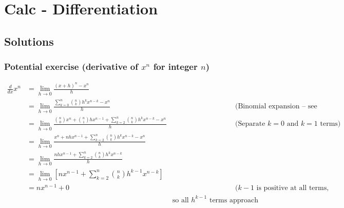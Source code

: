 \documentclass{book}
\begin{document}
\chapter{Calc - Differentiation}





\section{Solutions}

\subsection{Potential exercise (derivative of $x^n$ for integer $n$)}

\begin{align*}
\frac{d}{dx}x^n &= \lim_{h \rightarrow 0} \frac{(x+h)^n - x^n}{h} \\
&= \lim_{h \rightarrow 0} \frac{\sum_{k=0}^n \binom{n}{k}h^k x^{n-k} - x^n}{h} && \text{(Binomial expansion -- see chapter)} \\
&= \lim_{h \rightarrow 0} \frac{\binom{n}{0}x^n + \binom{n}{1}hx^{n-1} + \sum_{k=2}^n \binom{n}{k}h^k x^{n-k} - x^n}{h} && \text{(Separate $k=0$ and $k=1$ terms)} \\
&= \lim_{h \rightarrow 0} \frac{x^n + nhx^{n-1} + \sum_{k=2}^n \binom{n}{k}h^k x^{n-k} - x^n}{h} \\
&= \lim_{h \rightarrow 0} \frac{nhx^{n-1} + \sum_{k=2}^n \binom{n}{k}h^k x^{n-k}}{h} \\
&= \lim_{h \rightarrow 0} \left[nx^{n-1} + \sum_{k=2}^n \binom{n}{k}h^{k-1} x^{n-k}\right] \\
&= nx^{n-1} + 0 && \text{($k-1$ is positive at all terms, }\\
&& \text{so all $h^{k-1}$ terms approach 0)} \\
\end{align*}
\end{document}
